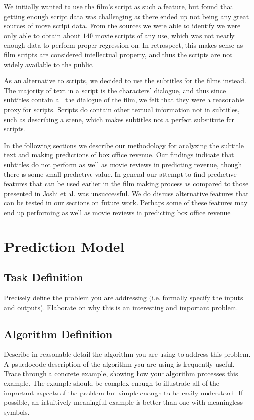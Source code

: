 \documentclass[11pt]{article}
\begin{document}
We initially wanted to use the film's script as such a feature, but found that getting
enough script data was challenging as there ended up not being any great sources of
move script data. From the sources we were able to identify we were only able to
obtain about $140$ movie scripts of any use, which was not nearly enough data to perform
proper regression on. In retrospect, this makes sense as film scripts are considered
intellectual property, and thus the scripts are not widely available to the public.

As an alternative to scripts, we decided to use the subtitles for the films instead. The
majority of text in a script is the characters' dialogue, and thus since subtitles contain
all the dialogue of the film, we felt that they were a reasonable proxy for scripts.
Scripts do contain other textual information not in subtitles, such as describing a scene,
which makes subtitles not a perfect substitute for scripts.

In the following sections we describe our methodology for analyzing the subtitle text
and making predictions of box office revenue. Our findings indicate that subtitles do
not perform as well as movie reviews in predicting revenue, though there is some small
predictive value. In general our attempt to find predictive features that can be used
earlier in the film making process as compared to those presented in Joshi et al. was 
unsuccessful. We do discuss alternative features that can be tested in our sections on
future work. Perhaps some of these features may end up performing as well as movie reviews
in predicting box office revenue.

\section{Prediction Model}
\subsection{Task Definition}
Precisely define the problem you are addressing (i.e. formally specify the inputs and
outputs). Elaborate on why this is an interesting and important problem. 

\subsection{Algorithm Definition}
Describe in reasonable detail the algorithm you are using to address this problem. A
psuedocode description of the algorithm you are using is frequently useful. Trace through
a concrete example, showing how your algorithm processes this example. The example should
be complex enough to illustrate all of the important aspects of the problem but simple
enough to be easily understood. If possible, an intuitively meaningful example is better
than one with meaningless symbols.
\end{document}
